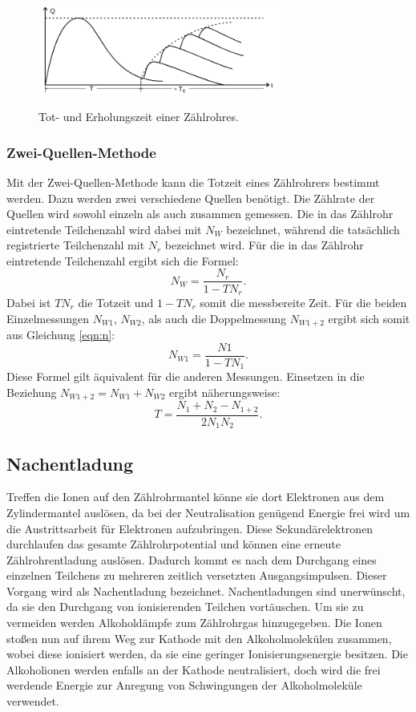 \begin{figure}
  \centering
  \includegraphics[width=8cm]{tot.png}
  \caption{Tot- und Erholungszeit einer Zählrohres.}
  \cite{skript}
\end{figure}

\subsubsection{Zwei-Quellen-Methode}
Mit der Zwei-Quellen-Methode kann die Totzeit eines Zählrohrers bestimmt werden.
Dazu werden zwei verschiedene Quellen benötigt. Die Zählrate der Quellen wird sowohl einzeln
als auch zusammen gemessen. Die in das Zählrohr eintretende Teilchenzahl wird dabei mit $N_W$
bezeichnet, während die tatsächlich registrierte Teilchenzahl mit $N_r$
bezeichnet wird. Für die in das Zählrohr eintretende Teilchenzahl ergibt sich die
Formel:
\begin{equation}
  N_W=\frac{N_r}{1-TN_r}.
  \label{eqn:n}
\end{equation}
Dabei ist $TN_r$ die Totzeit und $1-TN_r$ somit die messbereite Zeit.
Für die beiden Einzelmessungen $N_{W1}$, $N_{W2}$, als auch die Doppelmessung $N_{W1+2}$ ergibt sich somit aus
Gleichung \ref{eqn:n}:
\begin{equation}
  N_{W1}=\frac{N1}{1-TN_1}.
\end{equation}
Diese Formel gilt äquivalent für die anderen Messungen.
Einsetzen in die Beziehung $N_{W1+2}=N_{W1}+N_{W2}$ ergibt näherungsweise:
\begin{equation}
  T=\frac{N_1+ N_2- N_{1+2}}{2N_1 N_2}.
  \label{eqn:tot}
\end{equation}

\subsection{Nachentladung}
Treffen die Ionen auf den Zählrohrmantel könne sie dort Elektronen aus dem
Zylindermantel auslösen, da bei der Neutralisation genügend Energie frei wird
um die Austrittsarbeit für Elektronen aufzubringen. Diese Sekundärelektronen
durchlaufen das gesamte Zählrohrpotential und können eine erneute Zählrohrentladung
auslösen. Dadurch kommt es nach dem Durchgang eines einzelnen Teilchens zu mehreren zeitlich
versetzten Ausgangsimpulsen. Dieser Vorgang wird als Nachentladung bezeichnet.
Nachentladungen sind unerwünscht, da sie den Durchgang von ionisierenden Teilchen
vortäuschen. Um sie zu vermeiden werden Alkoholdämpfe zum Zählrohrgas hinzugegeben.
Die Ionen stoßen nun auf ihrem Weg zur Kathode mit den Alkoholmolekülen zusammen, wobei
diese ionisiert werden, da sie eine geringer Ionisierungsenergie besitzen.
Die Alkoholionen werden enfalls an der Kathode neutralisiert, doch wird die frei werdende
Energie zur Anregung von Schwingungen der Alkoholmoleküle verwendet.

